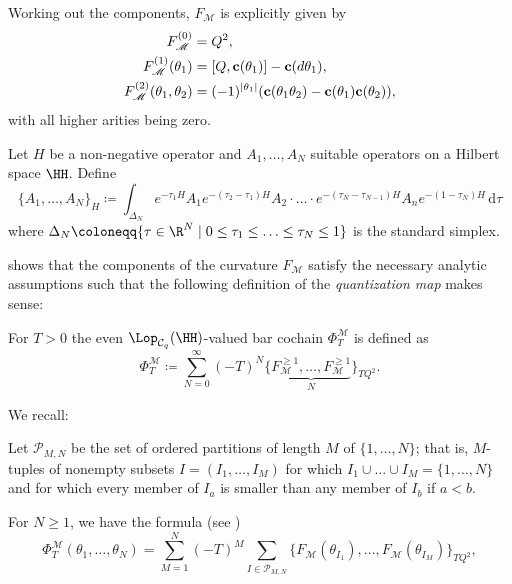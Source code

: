 \documentclass[a4paper, english, 12pt, bibliography=totocnumbered,
index=totoc]{scrartcl}
\begin{document}
Working out the components, $F_{\mathscr{M}}$ is explicitly given by
\begin{align}\label{Components curvature}
	F_{\mathscr{M}}^{(0)} & = Q^2, \notag\\
	F_{\mathscr{M}}^{(1)}(\theta_1) & = [Q, \mathbf{c}(\theta_1)] - \mathbf{c}(d
	\theta_1), \\
	F_{\mathscr{M}}^{(2)}(\theta_1, \theta_2) & = (-1)^{\lvert
		\theta_1 \rvert}(\mathbf{c}(\theta_1 \theta_2) - \mathbf{c}(\theta_1)
	\mathbf{c}(\theta_2)),\notag
\end{align}
with all higher arities being zero.
\begin{nota}
	Let $H$ be a non-negative operator and $A_1, \ldots, A_N$ suitable
	operators on a Hilbert space $\HH$.
	Define
	\begin{equation*}
		\{A_1, \ldots, A_N\}_{H} \coloneqq \int_{\Delta_N} e^{-\tau_1 H} A_1
		e^{-(\tau_2 - \tau_1)H} A_2 \cdot \ldots \cdot e^{-(\tau_{N} -
			\tau_{N-1})H}A_n e^{-(1 - \tau_N)H} \, \mathrm{d} \tau
	\end{equation*}
	where $\Delta_N\coloneqq \{\tau \in \R^N \mid 0 \leq \tau_1 \leq \ldots
	\leq \tau_N \leq 1\}$ is the standard simplex.
\end{nota}
\cite[Lemma 4.2]{GüneysuLudewig} shows that the components of the curvature
$F_{\mathscr{M}}$ satisfy the necessary analytic assumptions such that the
following definition of the \textit{quantization map} makes sense:
\begin{defn}\label{Defn Quantization}
	For $T>0$ the even $\Lop_{\mathcal{C}_q}(\HH)$-valued bar cochain 
	$\Phi^{\mathscr{M}}_T$ is defined as
	\begin{equation*}
		\Phi^{\mathscr{M}}_T \coloneqq \sum_{N=0}^\infty (-T)^N
		\bigl\{\underbrace{F^{\geq 1}_{\mathscr{M}}, \dots, F^{\geq
		1}_{\mathscr{M}}}_N\bigr\}_{TQ^2}.
	\end{equation*}
\end{defn}
We recall:
\begin{nota}
	Let $\mathcal{P}_{M, N}$ be the set of ordered partitions of length $M$ 
	of $\{1, \ldots, N\}$; that is, $M$-tuples of nonempty subsets
	$I = (I_1, \ldots, I_M)$ for which $I_1 \cup \ldots \cup I_M = \{1, \dots,
	N\}$ and for which every member of $I_a$ is smaller than any member of
	$I_b$ if $a < b$.
\end{nota}
For $N \geq 1$, we have the formula (see \cite[Eq.
(4.8)]{GüneysuLudewig})
\begin{equation*}
	\Phi^{\mathscr{M}}_T(\theta_1, \dots, \theta_N) = \sum_{M=1}^N (-T)^M
	\sum_{I \in
		\mathscr{P}_{M, N}} \bigl\{ F_{\mathscr{M}}(\theta_{I_1}), \dots,
	F_{\mathscr{M}}(\theta_{I_M})\bigr\}_{TQ^2},
\end{equation*}
\end{document}
